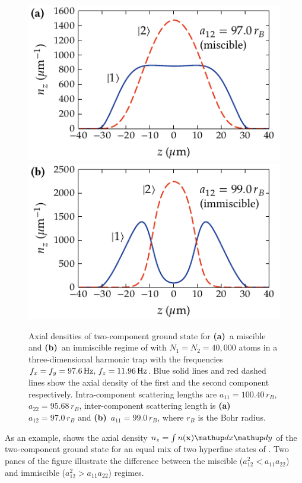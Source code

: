 \begin{figure}
\centerline{%
\includegraphics{figures_generated/mean_field/two_comp_gs_miscible.pdf}%
\includegraphics{figures_generated/mean_field/two_comp_gs_immiscible.pdf}}

\caption[Two-component ground state for miscible and immiscible regimes]{
Axial densities of two-component ground state for \textbf{(a)}~a miscible and \textbf{(b)}~an immiscible regime of \Rb{}  with $N_1 = N_2 = 40,000$ atoms in a three-dimensional harmonic trap with the frequencies $f_x = f_y = 97.6\mbox{\ensuremath{\,\mathrm{Hz}}},\,f_z = 11.96\mbox{\ensuremath{\,\mathrm{Hz}}}$.
Blue solid lines and red dashed lines show the axial density of the first and the second component respectively.
Intra-component scattering lengths are $a_{11} = 100.40\,r_B$, $a_{22} = 95.68\,r_B$, inter-component scattering length is \textbf{(a)}~$a_{12} = 97.0\,r_B$ and \textbf{(b)}~$a_{11} = 99.0\,r_B$, where $r_B$ is the Bohr radius.}%
\label{fig:bec-noise:mean-field:two-comp-gs}
\end{figure}

As an example,  shows the axial density $n_z = \int n(\xvec) \upd x \upd y$ of the two-component ground state for an equal mix of two hyperfine states of \Rb{} .
Two panes of the figure illustrate the difference between the miscible ($a_{12}^2 < a_{11} a_{22}$) and immiscible ($a_{12}^2 > a_{11} a_{22}$) regimes.

